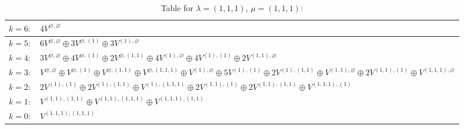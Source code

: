 \documentclass[a4paper,12pt]{article}
\begin{document}
\renewcommand{\arraystretch}{1.6} 
\begin{table}[H]
\centering
\caption{Table for $\lambda = (1, 1, 1)$, $\mu = (1, 1, 1)$:}
\begin{tabular}{|>{\centering\arraybackslash}p{15cm}|}
\hline
 $k = 6: \quad 4 V^{\varnothing, \varnothing} $ \\ \hline
 $k = 5: \quad 6 V^{\varnothing, \varnothing} \oplus 3 V^{\varnothing, (1)} \oplus 3 V^{(1), \varnothing} $ \\ \hline
 $k = 4: \quad 3 V^{\varnothing, \varnothing} \oplus 4 V^{\varnothing, (1)} \oplus 2 V^{\varnothing, (1, 1)} \oplus 4 V^{(1), \varnothing} \oplus 4 V^{(1), (1)} \oplus 2 V^{(1, 1), \varnothing} $ \\ \hline
 $k = 3: \quad V^{\varnothing, \varnothing} \oplus V^{\varnothing, (1)} \oplus V^{\varnothing, (1, 1)} \oplus V^{\varnothing, (1, 1, 1)} \oplus V^{(1), \varnothing} \oplus 5 V^{(1), (1)} \oplus 2 V^{(1), (1, 1)} \oplus V^{(1, 1), \varnothing} \oplus 2 V^{(1, 1), (1)} \oplus V^{(1, 1, 1), \varnothing} $ \\ \hline
 $k = 2: \quad 2 V^{(1), (1)} \oplus 2 V^{(1), (1, 1)} \oplus V^{(1), (1, 1, 1)} \oplus 2 V^{(1, 1), (1)} \oplus 2 V^{(1, 1), (1, 1)} \oplus V^{(1, 1, 1), (1)} $ \\ \hline
 $k = 1: \quad V^{(1, 1), (1, 1)} \oplus V^{(1, 1), (1, 1, 1)} \oplus V^{(1, 1, 1), (1, 1)} $ \\ \hline
 $k = 0: \quad V^{(1, 1, 1), (1, 1, 1)} $ \\ \hline
\end{tabular}
\end{table}

\end{document}
